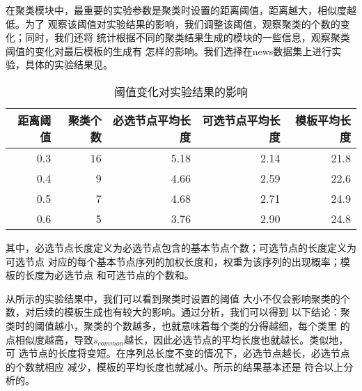 在聚类模块中，最重要的实验参数是聚类时设置的距离阈值，距离越大，相似度越低。为了
观察该阈值对实验结果的影响，我们调整该阈值，观察聚类的个数的变化；同时，我们还将
统计根据不同的聚类结果生成的模块的一些信息，观察聚类阈值的变化对最后模板的生成有
怎样的影响。我们选择在news数据集上进行实验，具体的实验结果见。

\begin{table}[h]
\begin{tabular}{rrrrr}
  \toprule
距离阈值 & 聚类个数 & 必选节点平均长度 & 可选节点平均长度 & 模板平均长度 \\
\hline
0.3 & 16 & 5.18 & 2.14 & 21.8 \\
0.4 & 9 & 4.66 & 2.59 & 22.6 \\
0.5 & 7 & 4.68 & 2.71 & 24.9 \\
0.6 & 5 & 3.76 & 2.90 & 24.8 \\
\bottomrule
\end{tabular}
\caption{阈值变化对实验结果的影响\label{experiment:tab:threshold}}
\end{table}
\begin{comment}
#+ORGTBL: SEND 阈值变化 orgtbl-to-latex :splice nil :skip 0
| 距离阈值 | 聚类个数 | 必选节点平均长度 | 可选节点平均长度 | 模板平均长度 |
|----------+----------+------------------+------------------+--------------|
|      0.3 |       16 |             5.18 |             2.14 |         21.8 |
|      0.4 |        9 |             4.66 |             2.59 |         22.6 |
|      0.5 |        7 |             4.68 |             2.71 |         24.9 |
|      0.6 |        5 |             3.76 |             2.90 |         24.8 |
\end{comment}

其中，必选节点长度定义为必选节点包含的基本节点个数；可选节点的长度定义为可选节点
对应的每个基本节点序列的加权长度和，权重为该序列的出现概率；模板的长度为必选节点
和可选节点的个数和。

从所示的实验结果中，我们可以看到聚类时设置的阈值
大小不仅会影响聚类的个数，对后续的模板生成也有较大的影响。通过分析，我们可以得到
以下结论：聚类时的阈值越小，聚类的个数越多，也就意味着每个类的分得越细，每个类里
的点相似度越高，导致$s_{common}$越长，因此必选节点的平均长度也就越长。类似地，可
选节点的长度将变短。在序列总长度不变的情况下，必选节点越长，必选节点的个数就相应
减少，模板的平均长度也就减小。所示的结果基本还是
符合以上分析的。


